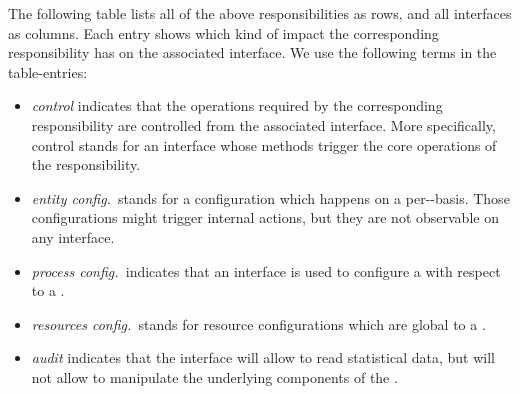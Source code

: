 \documentclass[a4paper, 12pt]{book}
\begin{document}
The following table lists all of the above responsibilities as rows, and all
interfaces as columns. Each entry shows which kind of impact the
corresponding responsibility has on the associated interface. We use the
following terms in the table-entries:
\begin{itemize}
\item \emph{control} indicates that the operations required by the
  corresponding responsibility are controlled from the associated
  interface. More specifically, control stands for an interface whose methods
  trigger the core operations of the responsibility.
\item \emph{entity config.~}stands for a configuration which happens on a
  per--basis. Those configurations might trigger internal
  actions, but they are not observable on any interface.
\item \emph{process config.~}indicates that an interface is used to
  configure a  with respect to a .
\item \emph{resources config.~}stands for resource configurations which are
  global to a .
\item \emph{audit} indicates that the interface will allow to read statistical
  data, but will not allow to manipulate the underlying components of
  the \SYNEIGHT.
\end{itemize}
%
\end{document}
